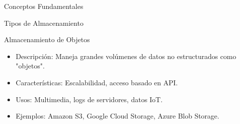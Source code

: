 \documentclass[presentation]{beamer}
\begin{document}
\begin{frame}[label={sec:orge94a22b}]{Conceptos Fundamentales}
\begin{block}{Tipos de Almacenamiento}
\begin{block}{Almacenamiento de Objetos}
\begin{itemize}
\item \alert{\alert{Descripción:}} Maneja grandes volúmenes de datos no estructurados como "objetos".
\item \alert{\alert{Características:}} Escalabilidad, acceso basado en API.
\item \alert{\alert{Usos:}} Multimedia, logs de servidores, datos IoT.
\item \alert{\alert{Ejemplos:}} Amazon S3, Google Cloud Storage, Azure Blob Storage.
\end{itemize}
\end{block}
\end{block}
\end{frame}
\end{document}

